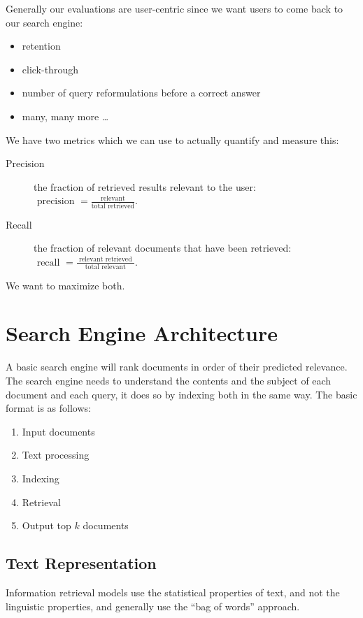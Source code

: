 Generally our evaluations are user-centric since we want users to come back to our search engine:
\begin{itemize}
    \item retention
    \item click-through
    \item number of query reformulations before a correct answer
    \item many, many more \ldots
\end{itemize}
We have two metrics which we can use to actually quantify and measure this:
\begin{description}
    \item[Precision] the fraction of retrieved results relevant to the user: \(\text{ precision }=\frac{\text{relevant}}{\text{total retrieved}}\).
    \item[Recall] the fraction of relevant documents that have been retrieved: \(\text{ recall }=\frac{\text{ relevant retrieved }}{\text{ total relevant }}\).
\end{description}
We want to maximize both.

\section{Search Engine Architecture}\label{sec:search_engine_architecture}

A basic search engine will rank documents in order of their predicted relevance.
The search engine needs to understand the contents and the subject of each document and each query, it does so by indexing both in the same way.
The basic format is as follows:
\begin{enumerate}
    \item Input documents
    \item Text processing
    \item Indexing
    \item Retrieval
    \item Output top \(k\) documents
\end{enumerate}

\subsection{Text Representation}\label{sub:text_representation}

Information retrieval models use the statistical properties of text, and not the linguistic properties, and generally use the ``bag of words'' approach.


